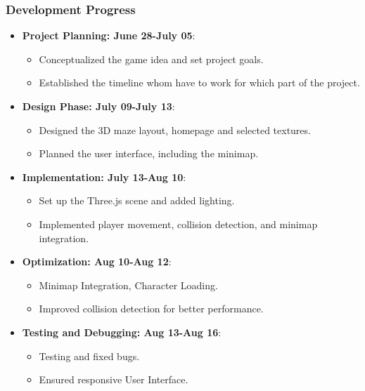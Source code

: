 \documentclass[9pt]{beamer}
\begin{document}
\begin{frame}
    \frametitle{Development Progress}
    \begin{itemize}
        \item \textbf{Project Planning: June 28-July 05}: 
        \begin{itemize}
            \item Conceptualized the game idea and set project goals.
            \item Established the timeline whom have to work for which part of the project.
        \end{itemize}
        \vspace{0.5em}
        
        \item \textbf{Design Phase: July 09-July 13}: 
        \begin{itemize}
            \item Designed the 3D maze layout, homepage and selected textures.
            \item Planned the user interface, including the minimap.
        \end{itemize}
        \vspace{0.5em}
        
        \item \textbf{Implementation: July 13-Aug 10}: 
        \begin{itemize}
            \item Set up the Three.js scene and added lighting.
            \item Implemented player movement, collision detection, and minimap integration.
        \end{itemize}
        \vspace{0.5em}
        
        \item \textbf{Optimization: Aug 10-Aug 12}: 
        \begin{itemize}
            \item Minimap Integration, Character Loading.
            \item Improved collision detection for better performance.
        \end{itemize}
        
        \vspace{0.5em}
        \item \textbf{Testing and Debugging: Aug 13-Aug 16}: 
        \begin{itemize}
            \item Testing and fixed bugs.
            \item Ensured responsive User Interface.
        \end{itemize}
    \end{itemize}
\end{frame}
        
\end{document}
